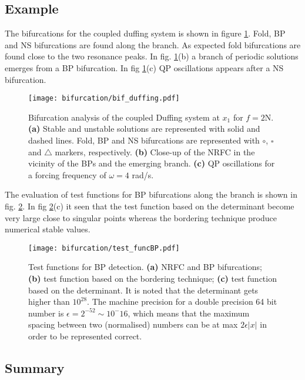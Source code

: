 \subsection{Example}
\label{sec:bif_example}

The bifurcations for the coupled duffing system is shown in figure
\ref{fig:bif_example}. Fold, BP and NS bifurcations are found along the branch.
As expected fold bifurcations are found close to the two resonance peaks. In
fig. \ref{fig:bif_example}(b) a branch of periodic solutions emerges from a BP
bifurcation. In fig \ref{fig:bif_example}(c) QP oscillations appears after a NS
bifurcation.

\begin{figure}[ht!]
  \centering
    \texttt{[image: bifurcation/bif\_duffing.pdf]}
  \caption{Bifurcation analysis of the coupled Duffing system at $x_1$ for
    $f=2$N.
    \textbf{(a)} Stable and unstable solutions are represented with solid and
    dashed lines. Fold, BP and NS bifurcations are represented with $\bm \circ$,
    $\bm \square$ and $\bm \triangle$ markers, respectively.
    \textbf{(b)} Close-up of the NRFC in the vicinity of the BPs and the
    emerging branch.
    \textbf{(c)} QP oscillations for a forcing frequency of $\omega=4$ rad/s.}
  \label{fig:bif_example}
\end{figure}

The evaluation of test functions for BP bifurcations along the branch is shown
in fig. \ref{fig:bif_BPtestfunction}. In fig \ref{fig:bif_BPtestfunction}(c) it
seen that the test function based on the determinant become very large close to
singular points whereas the bordering technique produce numerical stable values.

\begin{figure}[ht!]
  \centering
  \texttt{[image: bifurcation/test\_funcBP.pdf]}
  \caption{Test functions for BP detection.
    \textbf{(a)} NRFC and BP bifurcations;
    \textbf{(b)} test function based on the bordering technique;
    \textbf{(c)} test function based on the determinant. It is noted that the
    determinant gets higher than $10^{28}$. The machine precision for a
    double precision 64 bit number is $\epsilon = 2^{-52} \sim 10^-{16}$,
    which means that the maximum spacing between two (normalised) numbers can be
    at max $2\epsilon |x|$ in order to be represented correct.}
  \label{fig:bif_BPtestfunction}
\end{figure}

\subsection{Summary}
\label{sec:bif_summary}

